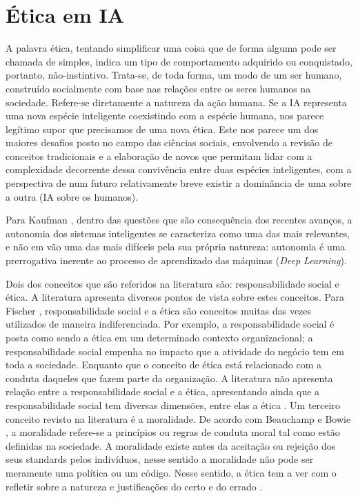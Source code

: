 \section{Ética em IA}

A palavra ética, tentando simplificar uma coisa que de forma alguma pode ser chamada de simples, indica um tipo de comportamento adquirido ou conquistado, portanto, não-instintivo. Trata-se, de toda forma, um modo de um ser humano, construído socialmente com base nas relações entre os seres humanos na sociedade. Refere-se diretamente a natureza da ação humana. Se a IA representa uma nova espécie inteligente coexistindo com a espécie humana, nos parece legítimo supor que precisamos de uma nova ética. Este nos parece um dos maiores desafios posto no campo das ciências sociais, envolvendo a revisão de conceitos tradicionais e a elaboração de novos que permitam lidar com a complexidade decorrente dessa convivência entre duas espécies inteligentes, com a perspectiva de num futuro relativamente breve existir a dominância de uma sobre a outra (IA sobre os humanos)\cite{kaufman}.

Para Kaufman \cite{kaufman}, dentro das questões que são consequência dos recentes avanços, a autonomia dos sistemas inteligentes se caracteriza como uma das mais relevantes, e não em vão uma das mais difíceis pela sua própria natureza: autonomia é uma prerrogativa inerente ao processo de aprendizado das máquinas (\textit{Deep Learning}).

Dois dos conceitos que são referidos na literatura são: responsabilidade social e ética. A literatura apresenta diversos pontos de vista sobre estes conceitos. Para Fischer \cite{socialresponsability}, responsabilidade social e a ética são conceitos muitas das vezes utilizados de maneira indiferenciada. Por exemplo, a responsabilidade social é posta como sendo a ética em um determinado contexto organizacional; a responsabilidade social empenha no impacto que a atividade do negócio tem em toda a sociedade. Enquanto que o conceito de ética está relacionado com a conduta daqueles que fazem parte da organização. A literatura não apresenta relação entre a responsabilidade social e a ética, apresentando ainda que a responsabilidade social tem diversas dimensões, entre elas a ética \cite{socialresponsability}. Um terceiro conceito revisto na literatura é a moralidade. De acordo com Beauchamp e Bowie \cite{ethicaltheory}, a moralidade refere-se a princípios ou regras de conduta moral tal como estão definidas na sociedade. A moralidade existe antes da aceitação ou rejeição dos seus standards pelos indivíduos, nesse sentido a moralidade não pode ser meramente uma política ou um código. Nesse sentido, a ética tem a ver com o refletir sobre a natureza e justificações do certo e do errado \cite{ethicaltheory}.


